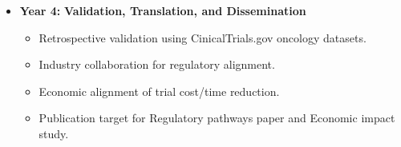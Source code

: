 \begin{itemize}
\begin{itemize}
        \end{itemize}
    \item \textbf{Year 4:} \textbf{Validation, Translation, and Dissemination}
        \begin{itemize}
            \item Retrospective validation using CinicalTrials.gov oncology datasets.
            \item Industry collaboration for regulatory alignment.
            \item Economic alignment of trial cost/time reduction.
            \item Publication target for Regulatory pathways paper and Economic impact study.
        \end{itemize}
\end{itemize}